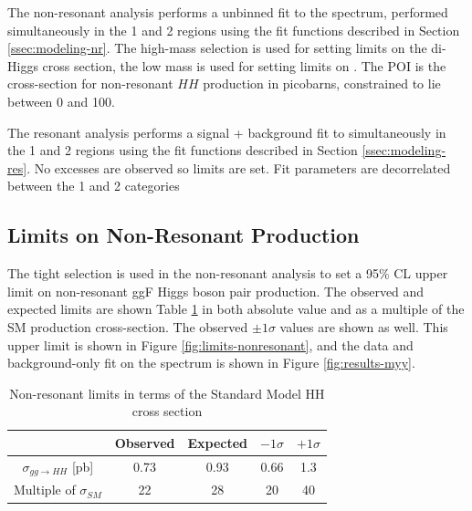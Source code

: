 The non-resonant analysis performs a unbinned fit to the \myy spectrum, performed simultaneously in the 1 and 2 \btag regions using the fit functions described in Section \ref{ssec:modeling-nr}. The high-mass selection is used for setting limits on the di-Higgs cross section, the low mass is used for setting limits on \klambda. The \gls{POI} is the cross-section for non-resonant $HH$ production in picobarns, constrained to lie between 0 and 100. 

The resonant analysis performs a signal + background fit to \myybb simultaneously in the 1 and 2 \btag regions using the fit functions described in Section \ref{ssec:modeling-res}. No excesses are observed so limits are set. Fit parameters are decorrelated between the 1 and 2 \btag categories

\subsection{Limits on Non-Resonant Production}

The tight selection is used in the non-resonant analysis to set a 95\% \gls{CL} upper limit on non-resonant \gls{ggF} Higgs boson pair production. The observed and expected limits are shown Table \ref{tab:nonresonant_results_SM} in both absolute value and as a multiple of the \gls{SM} production cross-section. The observed $\pm 1\sigma$ values are shown as well. This upper limit is shown in Figure \ref{fig:limits-nonresonant}, and the data and background-only fit on the \myy spectrum is shown in Figure \ref{fig:results-myy}.

\begin{table}[!htbp]
  \centering 
  \caption{Non-resonant limits in terms of the Standard Model HH cross section}
  \label{tab:nonresonant_results_SM} 

  \begin{tabular}{ccccc}
  \hline
  & Observed & Expected & $-1\sigma$  & $+1\sigma$ \\
  \hline
  $\sigma_{gg\rightarrow HH}$ [pb] & 0.73 & 0.93 & 0.66 & 1.3\\
  Multiple of $\sigma_{SM}$ & 22 & 28 & 20 & 40 \\
  \hline
  \end{tabular}
\end{table}

